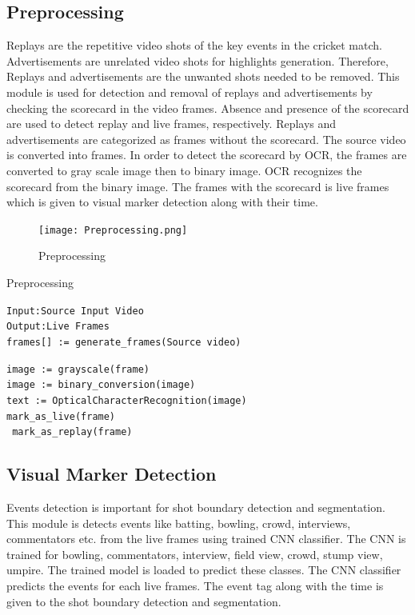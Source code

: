 \subsection{Preprocessing}
Replays are the repetitive video shots of the key events in the cricket match. Advertisements are unrelated video shots for highlights generation. Therefore, Replays and advertisements are the unwanted shots needed to be removed. This module is used for detection and removal of replays and advertisements by checking the scorecard in the video frames. Absence and presence of the scorecard are used to detect replay and live frames, respectively. Replays and advertisements are categorized as frames without the scorecard. The source video is converted into frames. In order to detect the scorecard by OCR, the frames are converted to gray scale image then to binary image. OCR recognizes the scorecard from the binary image. The frames with the scorecard is live frames which is given to visual marker detection along with their time.
\begin{figure}[h]
    \centering
   \texttt{[image: Preprocessing.png]}
    \caption{Preprocessing}
    \label{fig:preprocessing}
\end{figure}

\begin{algorithm}
\caption{Preprocessing}
\State \texttt{Input:Source Input Video}\\
\State \texttt{Output:Live Frames}\\
\State \texttt{frames[] := generate\_frames(Source video)}\\
\begin{algorithmic}

        \State \texttt{image := grayscale(frame)}\\
        \State \texttt{image := binary_conversion(image)}\\
        \State \texttt{text  := OpticalCharacterRecognition(image)}\\
                 \State \texttt{mark\_as\_live(frame)}\\
        \ELSE
             \State \texttt{ mark\_as\_replay(frame)}\\
             
        \ENDIF
\ENDFOR
\end{algorithmic}
\end{algorithm}

\newpage
\subsection{Visual Marker Detection}
Events detection is important for shot boundary detection and segmentation. This module is detects events like batting, bowling, crowd, interviews, commentators etc. from the live frames using trained CNN classifier. The CNN is trained for bowling, commentators, interview, field view, crowd, stump view, umpire. The trained model is loaded to predict these classes. The CNN classifier predicts the events for each live frames. The event tag along with the time is given to the shot boundary detection and segmentation.

